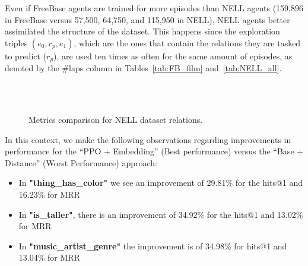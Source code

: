 Even if FreeBase agents are trained for more episodes than NELL agents (159,896 in FreeBase versus 57,500, 64,750, and 115,950 in NELL), NELL agents better assimilated the structure of the dataset. This happens since the exploration triples $(e_0, r_p, e_1)$, which are the ones that contain the relations they are tasked to predict ($r_p$), are used ten times as often for the same amount of episodes, as denoted by the \#laps column in Tables~\ref{tab:FB_film} and~\ref{tab:NELL_all}.

\begin{figure}[!h]
    \centering
    \def\subfigscale{0.5\columnwidth}
    ~
    \\
    \\
    \caption{Metrics comparison for NELL dataset relations.}
    \label{fig:nellcomparison}
\end{figure}

In this context, we make the following observations regarding improvements in performance for the ``PPO + Embedding'' (Best performance) versus the ``Base + Distance'' (Worst Performance) approach:

\begin{itemize}
    \item{In \textbf{"thing\_has\_color"} we see an improvement of 29.81\% for the hits@1 and 16.23\% for MRR}
    
    \item{In \textbf{"is\_taller"}, there is an improvement of 34.92\% for the hits@1 and 13.02\% for MRR}
    
    \item{In \textbf{"music\_artist\_genre"} the improvement is of 34.98\% for hits@1 and 13.04\% for MRR}
\end{itemize}


